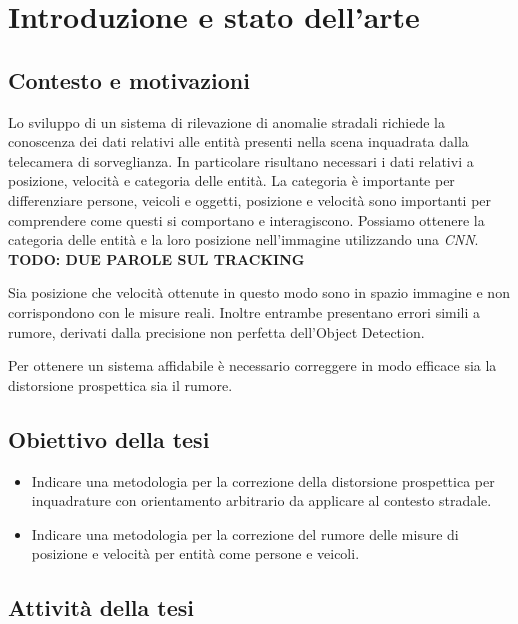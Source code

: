 \chapter{Introduzione e stato dell'arte}
\label{sec:introduzione}


\section{Contesto e motivazioni}

Lo sviluppo di un sistema di rilevazione di anomalie stradali richiede la conoscenza dei dati relativi alle entità presenti nella scena inquadrata dalla telecamera di sorveglianza.
In particolare risultano necessari i dati relativi a posizione, velocità e categoria delle entità.
La categoria è importante per differenziare persone, veicoli e oggetti, posizione e velocità sono importanti per comprendere come questi si comportano e interagiscono.
Possiamo ottenere la categoria delle entità e la loro posizione nell'immagine utilizzando una \emph{CNN}.
\textbf{TODO: DUE PAROLE SUL TRACKING}

Sia posizione che velocità ottenute in questo modo sono in spazio immagine e non corrispondono con le misure reali.
Inoltre entrambe presentano errori simili a rumore, derivati dalla precisione non perfetta dell'Object Detection.

Per ottenere un sistema affidabile è necessario correggere in modo efficace sia la distorsione prospettica sia il rumore.

\section{Obiettivo della tesi}
\begin{itemize}
	\item Indicare una metodologia per la correzione della distorsione prospettica per inquadrature con orientamento arbitrario da applicare al contesto stradale.
	\item Indicare una metodologia per la correzione del rumore delle misure di posizione e velocità per entità come persone e veicoli.
\end{itemize}

\section{Attività della tesi}

